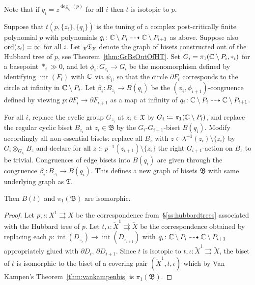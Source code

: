 \documentclass{amsart}
\begin{document}
Note that if $q_i=z^{\deg_{z_i}(p)}$ for all $i$ then $t$ is isotopic to
$p$.

\begin{thm}\label{thm:tuning}
  Suppose that $t(p,\{z_i\},\{q_i\})$ is the tuning of a complex
  post-critically finite polynomial $p$ with polynomials
  $q_i\colon{\mathbb C}\setminus P_i\dashrightarrow {\mathbb C}\setminus P_{i+1}$ as
  above. Suppose also $\operatorname{ord}(z_i)=\infty$ for all $i$. Let ${}_{\mathfrak X}{\mathfrak
    T}_{{\mathfrak X}}$ denote the graph of bisets constructed out of the Hubbard
  tree of $p$, see Theorem~\ref{thm:GrBsOutOfHT}. Set
  $G_i=\pi_1({\mathbb C}\setminus P_i,*_i)$ for a basepoint $*_i\gg0$, and let
  $\phi_i\colon G_{z_i}\to G_i$ be the monomorphism defined by identifying
  $\operatorname{int}(F_i)$ with ${\mathbb C}$ via $\psi_i$, so that the circle
  $\partial F_i$ corresponds to the circle at infinity in ${\mathbb C}\setminus
  P_i$. Let $\beta_i\colon B_{z_i}\to B(q_i)$ be the
  $(\phi_i,\phi_{i+1})$-congruence defined by viewing $p\colon\partial
  F_i\to\partial F_{i+1}$ as a map at infinity of $q_i\colon {\mathbb C}\setminus
  P_i \dashrightarrow {\mathbb C}\setminus P_{i+1}$.
  
  For all $i$, replace the cyclic group $G_{z_i}$ at $z_i\in\mathfrak X$ by
  $G_i\coloneqq\pi_1({\mathbb C}\setminus P_i)$, and replace the regular cyclic biset
  $B_{z_i}$ at $z_i\in\mathfrak B$ by the $G_{i}$-$G_{i+1}$-biset
  $B(q_i)$. Modify accordingly all non-essential bisets: replace all $B_z$
  with $z\in \lambda^{-1}(z_i)\setminus \{z_i\}$ by $G_i \otimes_{G_{z_i}}
  B_z$ and declare for all $z\in p^{-1}(z_{i+1})\setminus \{z_i\}$ the
  right $G_{i+1}$-action on $B_z$ to be trivial. Congruences of edge bisets
  into $B(q_i)$ are given through the congruence $\beta_i\colon B_{z_i}\to
  B(q_i)$. This defines a new graph of bisets $\mathfrak B$ with same
  underlying graph as $\mathfrak T$.

  Then $B(t)$ and $\pi_1(\mathfrak B)$ are isomorphic.
\end{thm}
\begin{proof}
  Let $p,\iota \colon X^1\rightrightarrows X$ be the correspondence
  from~\S\ref{ss:hubbardtrees} associated with the Hubbard tree of $p$. Let
  $t,\iota\colon\widetilde X^1\rightrightarrows \widetilde X$ be the
  correspondence obtained by replacing each $p\colon \operatorname{int}
  (D_{z_i})\to\operatorname{int} (D_{z_{i+1}})$ with $q_i\colon
  {\mathbb C}\setminus P_i \dashrightarrow {\mathbb C}\setminus P_{i+1}$ appropriately glued
  with $\partial D_i$, $\partial D_{i+1}$. Since $t$ is isotopic to
  $t,\iota\colon\widetilde X^1\rightrightarrows \widetilde X$, the biset of
  $t$ is isomorphic to the biset of a covering pair $(\widetilde X^1,
  t,\iota)$ which by Van Kampen's Theorem~\ref{thm:vankampenbis} is
  $\pi_1(\mathfrak B)$.
\end{proof}
\end{document}
